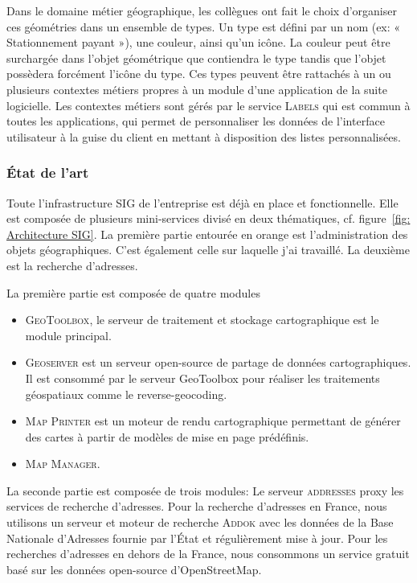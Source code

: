 \documentclass{rapportUHA40}
\begin{document}
Dans le domaine métier géographique, les collègues ont fait le choix
d'organiser ces géométries dans un ensemble de types. Un type est défini par un
nom (ex: « Stationnement payant »), une couleur, ainsi qu'un icône. La couleur
peut être surchargée dans l'objet géométrique que contiendra le type tandis que
l'objet possèdera forcément l'icône du type. Ces types peuvent être rattachés à
un ou plusieurs contextes métiers propres à un module d'une application de la
suite logicielle. Les contextes métiers sont gérés par le service
\textsc{Labels} qui est commun à toutes les applications, qui permet de
personnaliser les données de l'interface utilisateur à la guise du client en
mettant à disposition des listes personnalisées.

\subsubsection{État de l'art}
Toute l'infrastructure SIG de l'entreprise est déjà en place et fonctionnelle.
Elle est composée de plusieurs mini-services divisé en deux thématiques, cf.
figure~\ref{fig: Architecture SIG}. La première partie entourée en orange est
l'administration des objets géographiques. C'est également celle sur laquelle
j'ai travaillé. La deuxième est la recherche d'adresses.

La première partie est composée de quatre modules
\begin{itemize}
  \item \textsc{GeoToolbox}, le serveur de
        traitement et stockage cartographique est le module principal.
  \item \textsc{Geoserver} est un serveur open-source de partage de données cartographiques.
        Il est consommé par le serveur GeoToolbox pour réaliser les traitements
        géospatiaux comme le \gls{reverse-geocoding}.
  \item \textsc{Map Printer} est un moteur de rendu cartographique permettant de générer
        des cartes à partir de modèles de mise en page prédéfinis.
  \item \textsc{Map Manager}.
\end{itemize}

La seconde partie est composée de trois modules: Le serveur \textsc{addresses}
\gls{proxy} les services de recherche d'adresses. Pour la recherche d'adresses
en France, nous utilisons un serveur et moteur de recherche \textsc{Addok} avec
les données de la Base Nationale d'Adresses fournie par l'État et régulièrement
mise à jour. Pour les recherches d'adresses en dehors de la France, nous
consommons un service gratuit basé sur les données open-source d'OpenStreetMap.
\end{document}
